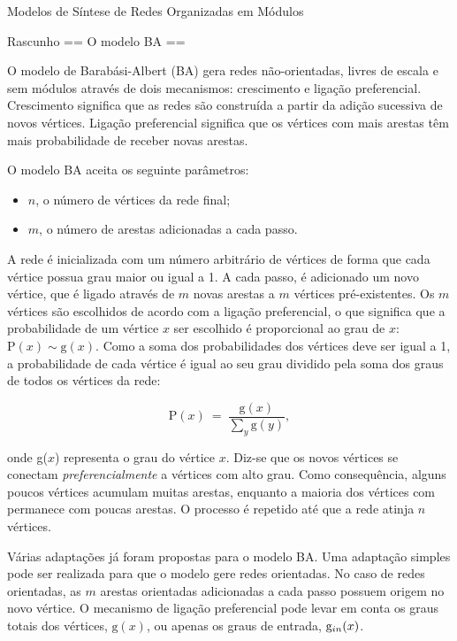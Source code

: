 \begin{section}{Modelos de Síntese de Redes Organizadas em Módulos}
\begin{subsection}{Rascunho}
	== O modelo BA ==
	
	O modelo de Barabási-Albert (BA) gera redes não-orientadas, livres de escala e sem módulos através de dois mecanismos: crescimento e ligação preferencial. Crescimento significa que as redes são construída a partir da adição sucessiva de novos vértices. Ligação preferencial significa que os vértices com mais arestas têm mais probabilidade de receber novas arestas.
	
	O modelo BA aceita os seguinte parâmetros:
	
	\begin{itemize}
		\item $n$, o número de vértices da rede final;
		\item $m$, o número de arestas adicionadas a cada passo.
	\end{itemize}
	
	A rede é inicializada com um número arbitrário de vértices de forma que cada vértice possua grau maior ou igual a 1. A cada passo, é adicionado um novo vértice, que é ligado através de $m$ novas arestas a $m$ vértices pré-existentes. Os $m$ vértices são escolhidos de acordo com a ligação preferencial, o que significa que a probabilidade de um vértice $x$ ser escolhido é proporcional ao grau de $x$: $\mathrm{P}(x) \sim \mathrm{g}(x)$. Como a soma dos probabilidades dos vértices deve ser igual a 1, a probabilidade de cada vértice é igual ao seu grau dividido pela soma dos graus de todos os vértices da rede:
	
	$$
	\mathrm{P}(x) ~=~ \frac{\mathrm{g}(x)}{\sum_y \mathrm{g}(y)},
	$$
	
	onde g($x$) representa o grau do vértice $x$. Diz-se que os novos vértices se conectam \emph{preferencialmente} a vértices com alto grau. Como consequência, alguns poucos vértices acumulam muitas arestas, enquanto a maioria dos vértices com permanece com poucas arestas. O processo é repetido até que a rede atinja $n$ vértices.
	
	
	Várias adaptações já foram propostas para o modelo BA. Uma adaptação simples pode ser realizada para que o modelo gere redes orientadas. No caso de redes orientadas, as $m$ arestas orientadas adicionadas a cada passo possuem origem no novo vértice. O mecanismo de ligação preferencial pode levar em conta os graus totais dos vértices, $\mathrm{g}(x)$, ou apenas os graus de entrada, $\mathrm{g}_{in}(x)$.
	


\end{subsection}
\end{section}
